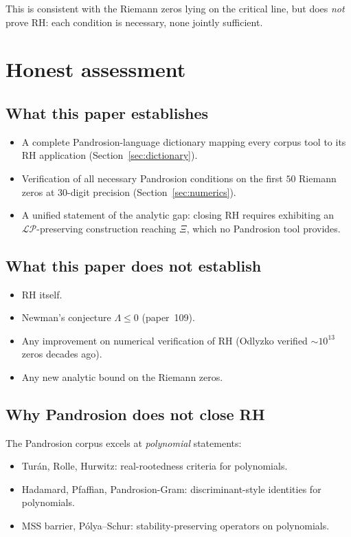 \documentclass[11pt,a4paper]{article}
\begin{document}
This is consistent with the Riemann zeros lying on the critical line, but
does \emph{not} prove RH: each condition is necessary, none jointly
sufficient.

\section{Honest assessment}\label{sec:assessment}

\subsection{What this paper establishes}
\begin{itemize}
\item A complete Pandrosion-language dictionary mapping every corpus tool
to its RH application (Section~\ref{sec:dictionary}).
\item Verification of all necessary Pandrosion conditions on the first
$50$ Riemann zeros at $30$-digit precision (Section~\ref{sec:numerics}).
\item A unified statement of the analytic gap: closing RH requires
exhibiting an $\mathcal{LP}$-preserving construction reaching $\Xi$, which
no Pandrosion tool provides.
\end{itemize}

\subsection{What this paper does not establish}
\begin{itemize}
\item RH itself.
\item Newman's conjecture $\Lambda \le 0$ (paper~109).
\item Any improvement on numerical verification of RH (Odlyzko verified
$\sim 10^{13}$ zeros decades ago).
\item Any new analytic bound on the Riemann zeros.
\end{itemize}

\subsection{Why Pandrosion does not close RH}

The Pandrosion corpus excels at \emph{polynomial} statements:
\begin{itemize}
\item Tur\'an, Rolle, Hurwitz: real-rootedness criteria for polynomials.
\item Hadamard, Pfaffian, Pandrosion-Gram: discriminant-style identities for
polynomials.
\item MSS barrier, P\'olya--Schur: stability-preserving operators on polynomials.
\end{itemize}
\end{document}
